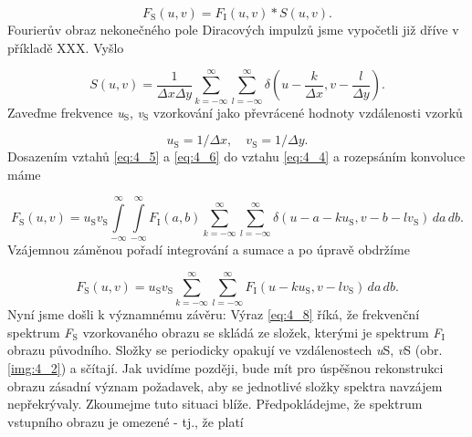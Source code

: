 \begin{equation} \label{eq:4_4}
    F_\mathrm{S}(u, v) = F_\mathrm{I}(u, v) * S(u, v).
\end{equation}
Fourierův obraz nekonečného pole Diracových impulzů jsme vypočetli již dříve v příkladě XXX. Vyšlo

\begin{equation} \label{eq:4_5}
    S(u, v) = \frac{1}{\Delta x \Delta y} \sum\limits_{k=-\infty}^{\infty} \sum\limits_{l=-\infty}^{\infty} \delta \left( u - \frac{k}{\Delta x}, v - \frac{l}{\Delta y} \right).
\end{equation}
Zaveďme frekvence \textit{u}$_\mathrm{S}$, \textit{v}$_\mathrm{S}$ vzorkování jako převrácené hodnoty vzdálenosti vzorků

\begin{equation} \label{eq:4_6}
    u_\mathrm{S} = 1 / \Delta x, \quad v_\mathrm{S} = 1 / \Delta y.
\end{equation}
Dosazením vztahů \eqref{eq:4_5} a \eqref{eq:4_6} do vztahu \eqref{eq:4_4} a rozepsáním konvoluce máme

\begin{equation} \label{eq:4_7}
    F_\mathrm{S}(u, v) = u_\mathrm{S} v_\mathrm{S} \int\limits_{-\infty}^{\infty} \int\limits_{-\infty}^{\infty} F_\mathrm{I}(a, b) \sum\limits_{k=-\infty}^{\infty} \sum\limits_{l=-\infty}^{\infty} \delta(u - a - k u_\mathrm{S}, v - b - l v_\mathrm{S}) \,da\,db.
\end{equation}
Vzájemnou záměnou pořadí integrování a sumace a po úpravě obdržíme

\begin{equation} \label{eq:4_8}
    F_\mathrm{S}(u, v) = u_\mathrm{S} v_\mathrm{S} \sum\limits_{k=-\infty}^{\infty} \sum\limits_{l=-\infty}^{\infty} F_\mathrm{I} (u - k u_\mathrm{S}, v - l v_\mathrm{S}) \,da\,db.
\end{equation}
Nyní jsme došli k významnému závěru: Výraz \eqref{eq:4_8} říká, že frekvenční spektrum \textit{F}$_\mathrm{S}$ vzorkovaného obrazu se skládá ze složek, kterými je spektrum \textit{F}$_\mathrm{I}$ obrazu původního. Složky se periodicky opakují ve vzdálenostech \textit{u}S, \textit{v}S (obr. \ref{img:4_2}) a sčítají. Jak uvidíme později, bude mít pro úspěšnou rekonstrukci obrazu zásadní význam požadavek, aby se jednotlivé složky spektra navzájem nepřekrývaly. Zkoumejme tuto situaci blíže. Předpokládejme, že spektrum vstupního obrazu je omezené - tj., že platí

